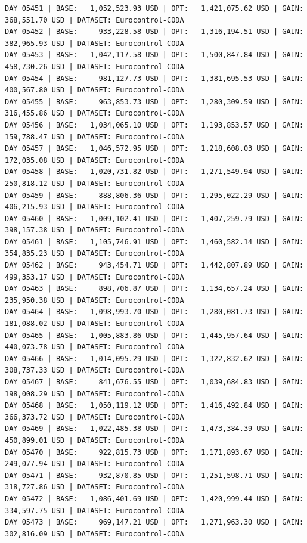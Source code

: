 \documentclass[11pt,a4paper]{article}
\begin{document}
\begin{verbatim}
DAY 05451 | BASE:   1,052,523.93 USD | OPT:   1,421,075.62 USD | GAIN: 368,551.70 USD | DATASET: Eurocontrol-CODA
DAY 05452 | BASE:     933,228.58 USD | OPT:   1,316,194.51 USD | GAIN: 382,965.93 USD | DATASET: Eurocontrol-CODA
DAY 05453 | BASE:   1,042,117.58 USD | OPT:   1,500,847.84 USD | GAIN: 458,730.26 USD | DATASET: Eurocontrol-CODA
DAY 05454 | BASE:     981,127.73 USD | OPT:   1,381,695.53 USD | GAIN: 400,567.80 USD | DATASET: Eurocontrol-CODA
DAY 05455 | BASE:     963,853.73 USD | OPT:   1,280,309.59 USD | GAIN: 316,455.86 USD | DATASET: Eurocontrol-CODA
DAY 05456 | BASE:   1,034,065.10 USD | OPT:   1,193,853.57 USD | GAIN: 159,788.47 USD | DATASET: Eurocontrol-CODA
DAY 05457 | BASE:   1,046,572.95 USD | OPT:   1,218,608.03 USD | GAIN: 172,035.08 USD | DATASET: Eurocontrol-CODA
DAY 05458 | BASE:   1,020,731.82 USD | OPT:   1,271,549.94 USD | GAIN: 250,818.12 USD | DATASET: Eurocontrol-CODA
DAY 05459 | BASE:     888,806.36 USD | OPT:   1,295,022.29 USD | GAIN: 406,215.93 USD | DATASET: Eurocontrol-CODA
DAY 05460 | BASE:   1,009,102.41 USD | OPT:   1,407,259.79 USD | GAIN: 398,157.38 USD | DATASET: Eurocontrol-CODA
DAY 05461 | BASE:   1,105,746.91 USD | OPT:   1,460,582.14 USD | GAIN: 354,835.23 USD | DATASET: Eurocontrol-CODA
DAY 05462 | BASE:     943,454.71 USD | OPT:   1,442,807.89 USD | GAIN: 499,353.17 USD | DATASET: Eurocontrol-CODA
DAY 05463 | BASE:     898,706.87 USD | OPT:   1,134,657.24 USD | GAIN: 235,950.38 USD | DATASET: Eurocontrol-CODA
DAY 05464 | BASE:   1,098,993.70 USD | OPT:   1,280,081.73 USD | GAIN: 181,088.02 USD | DATASET: Eurocontrol-CODA
DAY 05465 | BASE:   1,005,883.86 USD | OPT:   1,445,957.64 USD | GAIN: 440,073.78 USD | DATASET: Eurocontrol-CODA
DAY 05466 | BASE:   1,014,095.29 USD | OPT:   1,322,832.62 USD | GAIN: 308,737.33 USD | DATASET: Eurocontrol-CODA
DAY 05467 | BASE:     841,676.55 USD | OPT:   1,039,684.83 USD | GAIN: 198,008.29 USD | DATASET: Eurocontrol-CODA
DAY 05468 | BASE:   1,050,119.12 USD | OPT:   1,416,492.84 USD | GAIN: 366,373.72 USD | DATASET: Eurocontrol-CODA
DAY 05469 | BASE:   1,022,485.38 USD | OPT:   1,473,384.39 USD | GAIN: 450,899.01 USD | DATASET: Eurocontrol-CODA
DAY 05470 | BASE:     922,815.73 USD | OPT:   1,171,893.67 USD | GAIN: 249,077.94 USD | DATASET: Eurocontrol-CODA
DAY 05471 | BASE:     932,870.85 USD | OPT:   1,251,598.71 USD | GAIN: 318,727.86 USD | DATASET: Eurocontrol-CODA
DAY 05472 | BASE:   1,086,401.69 USD | OPT:   1,420,999.44 USD | GAIN: 334,597.75 USD | DATASET: Eurocontrol-CODA
DAY 05473 | BASE:     969,147.21 USD | OPT:   1,271,963.30 USD | GAIN: 302,816.09 USD | DATASET: Eurocontrol-CODA

\end{verbatim}
\end{document}
